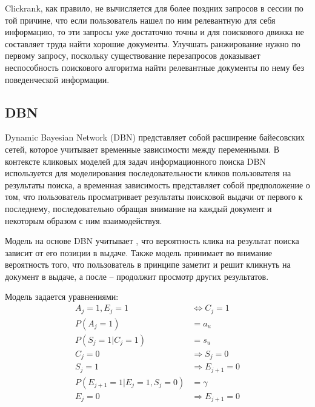 \documentclass[diploma]{nanolab2015}
\begin{document}
Clickrank, как правило, не вычисляется для более поздних запросов в сессии по той причине, что если пользователь нашел по ним релевантную для себя информацию, то эти запросы уже достаточно точны и для поискового движка не составляет труда найти хорошие документы. Улучшать ранжирование нужно по первому запросу, поскольку существование перезапросов доказывает неспособность поискового алгоритма найти релевантные документы по нему без поведенческой информации.

\subsection{DBN}
Dynamic Bayesian Network (DBN) представляет собой расширение байесовских сетей, которое учитывает временные зависимости между переменными. В контексте кликовых моделей для задач информационного поиска DBN используется для моделирования последовательности кликов пользователя на результаты поиска, а временная зависимость представляет собой предположение о том, что пользователь просматривает результаты поисковой выдачи от первого к последнему, последовательно обращая внимание на каждый документ и некоторым образом с ним взаимодействуя.

Модель на основе DBN учитывает \cite{DBN}, что вероятность клика на результат поиска зависит от его позиции в выдаче. Также модель принимает во внимание вероятность того, что пользователь в принципе заметит и решит кликнуть на документ в выдаче, а после -- продолжит просмотр других результатов.

Модель задается уравнениями:
\begin{align}
    A_j = 1, E_j = 1                  & \Leftrightarrow C_j = 1 \label{dbn:1} \\
    P(A_j = 1)                        & = a_u                  \label{dbn:2}  \\
    P(S_j = 1| C_j = 1)               & = s_u                   \label{dbn:3} \\
    C_j = 0                           & \Rightarrow S_j = 0 \label{dbn:4}     \\
    S_j = 1                           & \Rightarrow E_{j+1} = 0 \label{dbn:5} \\
    P(E_{j+1} = 1 | E_j = 1, S_j = 0) & = \gamma                \label{dbn:6} \\
    E_j = 0                           & \Rightarrow E_{j+1} = 0 \label{dbn:7}
\end{align}
\end{document}
